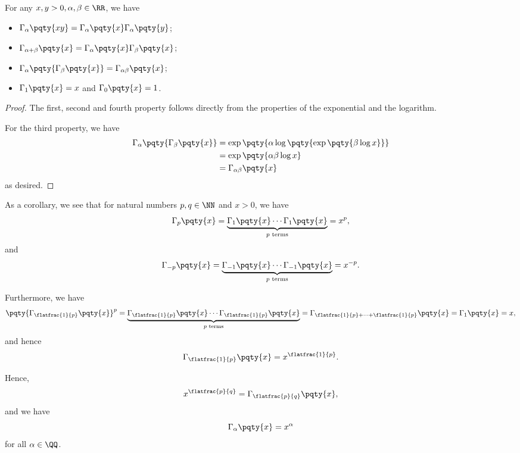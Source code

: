 \begin{lemma}
    \label{lem:properties-power}%
    For any \(x, y > 0, \alpha, \beta \in \RR\), we have
    \begin{itemize}
        \item \(\Gamma_\alpha \pqty{xy} = \Gamma_\alpha \pqty{x} \Gamma_\alpha \pqty{y}\);
        \item \(\Gamma_{\alpha + \beta} \pqty{x} = \Gamma_\alpha \pqty{x} \Gamma_\beta \pqty{x}\);
        \item \(\Gamma_\alpha \pqty{\Gamma_\beta \pqty{x}} = \Gamma_{\alpha \beta} \pqty{x}\);
        \item \(\Gamma_1\pqty{x} = x\) and \(\Gamma_0 \pqty{x} = 1\).
    \end{itemize}
\end{lemma}

\begin{proof}
    The first, second and fourth property follows directly from the properties of the exponential and the logarithm.

    For the third property, we have
    \begin{align*}
        \Gamma_\alpha \pqty{\Gamma_\beta \pqty{x}} &= \exp\pqty{\alpha \log\pqty{\exp \pqty{\beta \log x}}} \\
        &= \exp\pqty{\alpha \beta \log x} \\
        &= \Gamma_{\alpha \beta} \pqty{x}
    \end{align*}
    as desired.
\end{proof}

As a corollary, we see that for natural numbers \(p, q \in \NN\) and \(x > 0\), we have
\[
    \Gamma_p \pqty{x} = \underbrace{\Gamma_1 \pqty{x} \cdots \Gamma_1 \pqty{x}}_{p \text{ terms}} = x^p,
\]
and
\[
    \Gamma_{-p} \pqty{x} = \underbrace{\Gamma_{-1} \pqty{x} \cdots \Gamma_{-1} \pqty{x}}_{p \text{ terms}} = x^{-p}.
\]

Furthermore, we have
\[
    \pqty{\Gamma_{\flatfrac{1}{p}} \pqty{x}}^{p} = \underbrace{\Gamma_{\flatfrac{1}{p}} \pqty{x} \cdots \Gamma_{\flatfrac{1}{p}} \pqty{x}}_{p \text{ terms}} = \Gamma_{\flatfrac{1}{p} + \cdots + \flatfrac{1}{p}} \pqty{x} = \Gamma_1 \pqty{x} = x,
\]
and hence
\[
    \Gamma_{\flatfrac{1}{p}} \pqty{x} = x^{\flatfrac{1}{p}}.
\]

Hence,
\[
    x^{\flatfrac{p}{q}} = \Gamma_{\flatfrac{p}{q}} \pqty{x},
\]
and we have
\[
    \Gamma_{\alpha} \pqty{x} = x^\alpha
\]
for all \(\alpha \in \QQ\).


